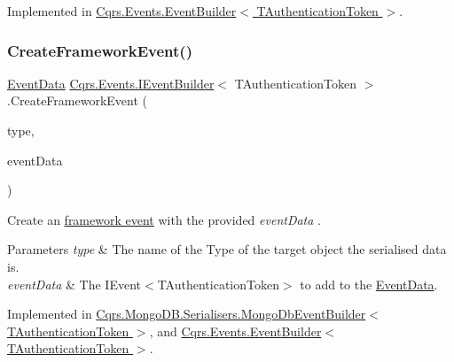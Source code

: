 Implemented in \hyperlink{classCqrs_1_1Events_1_1EventBuilder_abcc2515f98e4852ab656f1868e7a344c_abcc2515f98e4852ab656f1868e7a344c}{Cqrs.\+Events.\+Event\+Builder$<$ T\+Authentication\+Token $>$}.

\mbox{\label{interfaceCqrs_1_1Events_1_1IEventBuilder_ac77123302de4e79df9661c13219af4d4_ac77123302de4e79df9661c13219af4d4}} 
\subsubsection{\texorpdfstring{Create\+Framework\+Event()}{CreateFrameworkEvent()}\hspace{0.1cm}{\footnotesize\ttfamily [2/2]}}
{\footnotesize\ttfamily \hyperlink{classCqrs_1_1Events_1_1EventData}{Event\+Data} \hyperlink{interfaceCqrs_1_1Events_1_1IEventBuilder}{Cqrs.\+Events.\+I\+Event\+Builder}$<$ T\+Authentication\+Token $>$.Create\+Framework\+Event (\begin{DoxyParamCaption}\item[{string}]{type,  }\item[{\hyperlink{interfaceCqrs_1_1Events_1_1IEvent}{I\+Event}$<$ T\+Authentication\+Token $>$}]{event\+Data }\end{DoxyParamCaption})}



Create an \hyperlink{}{framework event} with the provided {\itshape event\+Data} . 


\begin{DoxyParams}{Parameters}
{\em type} & The name of the Type of the target object the serialised data is.\\
\hline
{\em event\+Data} & The I\+Event$<$\+T\+Authentication\+Token$>$ to add to the \hyperlink{classCqrs_1_1Events_1_1EventData}{Event\+Data}.\\
\hline
\end{DoxyParams}


Implemented in \hyperlink{classCqrs_1_1MongoDB_1_1Serialisers_1_1MongoDbEventBuilder_a06afbb994fd3f679f275dea3d1d60c6e_a06afbb994fd3f679f275dea3d1d60c6e}{Cqrs.\+Mongo\+D\+B.\+Serialisers.\+Mongo\+Db\+Event\+Builder$<$ T\+Authentication\+Token $>$}, and \hyperlink{classCqrs_1_1Events_1_1EventBuilder_aa6a794ef27f2795802a4390fd16535f6_aa6a794ef27f2795802a4390fd16535f6}{Cqrs.\+Events.\+Event\+Builder$<$ T\+Authentication\+Token $>$}.

